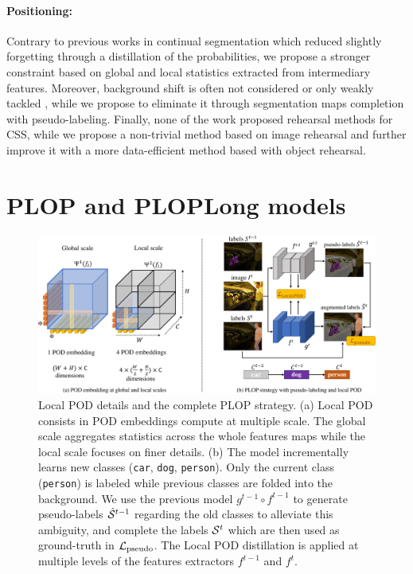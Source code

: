 \paragraph{Positioning:} Contrary to previous works in continual segmentation
\citep{michieli2019ilt,cermelli2020modelingthebackground} which reduced slightly forgetting through
a distillation of the probabilities, we propose a stronger constraint based on global and local
statistics extracted from intermediary features. Moreover, background shift is often not considered
\citep{michieli2019ilt} or only weakly tackled \citep{cermelli2020modelingthebackground}, while we
propose to eliminate it through segmentation maps completion with pseudo-labeling. Finally, none of
the work proposed rehearsal methods for \ac{CSS}, while we propose a non-trivial method based on
image rehearsal and further improve it with a more data-efficient method based with object
rehearsal.


\section{PLOP and PLOPLong models}
\label{sec:seg_plop}

\begin{figure}
    \centering
    \includegraphics[width=\linewidth]{images/seg/plop_strategy.pdf}
    \caption{Local POD details and the complete PLOP strategy. (a) Local POD consists in POD
        embeddings compute at multiple scale. The global scale aggregates statistics across the
        whole features maps while the local scale focuses on finer details.  (b) The model
        incrementally learns new classes (\eg \texttt{car}, \texttt{dog}, \texttt{person}). Only the
        current class (\texttt{person}) is labeled while previous classes are folded into the
        background. We use the previous model $g^{t-1} \circ f^{t-1}$ to generate pseudo-labels
        $\hat{\mathcal{S}}^{t-1}$ regarding the old classes to alleviate this ambiguity, and complete the
        labels $\mathcal{S}^t$ which are then used as ground-truth in $\mathcal{L}_\text{pseudo}$. The Local POD
        distillation is applied at multiple levels of the features extractors $f^{t-1}$ and $f^t$.}
    \label{fig:seg_model_plop}
\end{figure}

